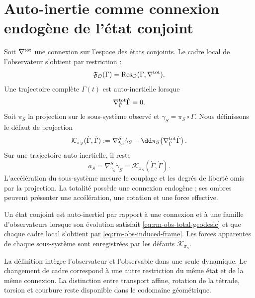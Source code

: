 \section{Auto-inertie comme connexion endogène de l'état conjoint}

Soit \(\nabla^{\rm tot}\) une connexion sur l'espace des états
conjoints. Le cadre local de l'observateur s'obtient par restriction :
\begin{equation}
 \mathfrak F_{\mathcal O}(\Gamma)
 =\operatorname{Res}_{\mathcal O}
 (\Gamma,\nabla^{\rm tot}).
 \label{eq:rm-obs-induced-frame}
\end{equation}
Une trajectoire complète \(\Gamma(t)\) est auto-inertielle lorsque
\begin{equation}
 \nabla^{\rm tot}_{\dot\Gamma}\dot\Gamma=0.
 \label{eq:rm-obs-total-geodesic}
\end{equation}
Soit \(\pi_S\) la projection sur le sous-système observé et
\(\gamma_S=\pi_S\circ\Gamma\). Nous définissons le défaut de projection
\begin{equation}
 \mathcal K_{\pi_S}(\dot\Gamma,\dot\Gamma)
 :=\nabla^S_{\dot\gamma_S}\dot\gamma_S
 -\dd\pi_S\!\left(
 \nabla^{\rm tot}_{\dot\Gamma}\dot\Gamma
 \right).
 \label{eq:rm-obs-projection-defect}
\end{equation}
Sur une trajectoire auto-inertielle, il reste
\begin{equation}
 \boxed{
 a_S=\nabla^S_{\dot\gamma_S}\dot\gamma_S
 =\mathcal K_{\pi_S}(\dot\Gamma,\dot\Gamma).}
 \label{eq:rm-obs-projected-acceleration}
\end{equation}
L'accélération du sous-système mesure le couplage et les degrés de liberté
omis par la projection. La totalité possède une connexion endogène ;
ses ombres peuvent présenter une accélération, une rotation et une force effective.

\begin{definition}
Un état conjoint est auto-inertiel par rapport à une connexion et à une famille
d'observateurs lorsque son évolution satisfait
\cref{eq:rm-obs-total-geodesic} et que chaque cadre local s'obtient par
\cref{eq:rm-obs-induced-frame}. Les forces apparentes de chaque sous-système sont
enregistrées par les défauts \(\mathcal K_{\pi_S}\).
\end{definition}

La définition intègre l'observateur et l'observable dans une seule dynamique.
Le changement de cadre correspond à une autre restriction du même état et de la
même connexion. La distinction entre transport affine, rotation de la
tétrade, torsion et courbure reste disponible dans le codomaine
géométrique.

